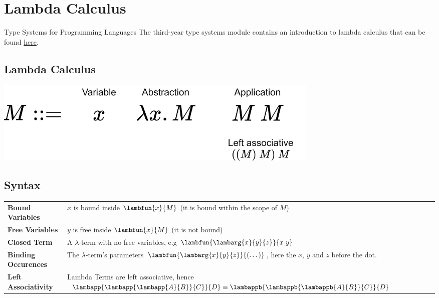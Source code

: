 \chapter{Lambda Calculus}

\begin{sidenotebox}{Type Systems for Programming Languages}
    The third-year type systems module contains an introduction to lambda calculus that can be found \href{https://oliverkillane.github.io/Imperial-Computing-Notes/60023%20-%20Type%20Systems%20for%20Programming%20Languages/}{here}. 
\end{sidenotebox}

\section{Lambda Calculus}
\begin{center}
    \includegraphics[width=0.7\textwidth]{lambda_calculus/images/lambda_form.drawio.png}
\end{center}

\section{Syntax}
\begin{center}
    \begin{tabular}{l p{}}
        \textbf{Bound Variables} & $x$ is bound inside $\lambfun{x}{M}$ (it is bound within the scope of $M$) \\
        \textbf{Free Variables} & $y$ is free inside $\lambfun{x}{M}$ (it is not bound) \\
        \textbf{Closed Term} & A $\lambda$-term with no free variables, e.g $\lambfun{\lambarg{x}{y}{z}}{x \ y}$ \\
        \textbf{Binding Occurences} & The $\lambda$-term's parameters $\lambfun{\lambarg{x}{y}{z}}{(\dots)}$, here the $x$, $y$ and $z$ before the dot. \\
        \textbf{Left Associativity} & Lambda Terms are left associative, hence $\lambapp{\lambapp{\lambapp{A}{B}}{C}}{D} \equiv \lambappb{\lambappb{\lambappb{A}{B}}{C}}{D}$ \\
    \end{tabular}
\end{center}

